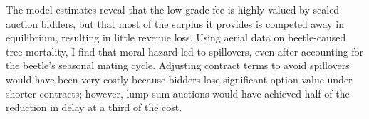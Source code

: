 \documentclass[11pt,letterpaper]{article}
\begin{document}
The model estimates reveal that the low-grade fee is highly valued by scaled auction bidders, but that most of the surplus it provides is competed away in equilibrium, resulting in little revenue loss. Using aerial data on beetle-caused tree mortality, I find that moral hazard led to spillovers, even after accounting for the beetle's seasonal mating cycle. Adjusting contract terms to avoid spillovers would have been very costly because bidders lose significant option value under shorter contracts; however, lump sum auctions would have achieved half of the reduction in delay at a third of the cost.
\end{document}
